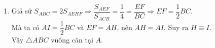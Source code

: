 \begin{ex}
{\begin{enumerate}
			Mà $\widehat{AFE}=\widehat{BAI}$ (cùng phụ với góc $\widehat{AEF}$)\\
			nên $\widehat{BAI}=\widehat{ABI}$, suy ra $\triangle IAB$ cân tại $I$, vậy $IA=IB$.\\
			Chứng minh tương tự ta có $IA=IC$, nên $I$ là trung điểm của $BC$
			\item Giả sử $S_{ABC}=2S_{AEHF}\Rightarrow\dfrac{S_{AEF}}{S_{ACB}}=\dfrac{1}{4}=\dfrac{EF}{BC}\Rightarrow EF=\dfrac{1}{2}BC$.\\
			Mà ta có $AI=\dfrac{1}{2}BC$ và $EF=AH$, nên $AH=AI$. Suy ra $H\equiv I$.\\
			Vậy $\triangle ABC$ vuông cân tại $A$.
	\end{enumerate}}
\end{ex}  

% 

